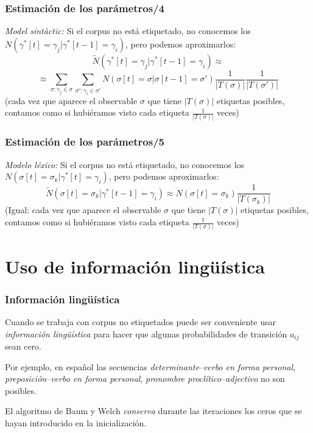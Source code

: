 \documentclass{beamer}
\begin{document}
\begin{frame}
\frametitle{ Estimación de los parámetros/4}

{
{\emph{Model sintàctic:} Si el corpus no está etiquetado, no
  conocemos los
  \(N(\gamma^*[t]=\gamma_j|\gamma^*[t-1]=\gamma_i)\), pero podemos
  aproximarlos:}
{
\[
\tilde{N}(\gamma^*[t]=\gamma_j|\gamma^*[t-1]=\gamma_i)\approx
\]
\[
\approx \sum_{\sigma:\gamma_j\in\sigma} \sum_{\sigma':\gamma_i\in\sigma'}
N(\sigma[t]=\sigma|\sigma[t-1]=\sigma') \frac{1}{|T(\sigma)|} \frac{1}{|T(\sigma')|}
\]
}
{(cada vez que aparece el observable \(\sigma\) que tiene
  \(|T(\sigma)|\) etiquetas posibles, contamos como si hubiéramos visto
  cada etiqueta \(\frac{1}{|T(\sigma)|}\) veces)}
}
\end{frame}
\begin{frame}
\frametitle{ Estimación de los parámetros/5}

{
{\emph{Modelo léxico:} Si el corpus no está etiquetado, no conocemos
los  \(N(\sigma[t]=\sigma_k|\gamma^*[t]=\gamma_i)\), pero podemos aproximarlos:}
{
\[
\tilde{N}(\sigma[t]=\sigma_k|\gamma^*[t-1]=\gamma_i)\approx
N(\sigma[t]=\sigma_k) \frac{1}{|T(\sigma_k)|}
\]
}
{(Igual: cada vez que aparece el observable \(\sigma\) que tiene
  \(|T(\sigma)|\) etiquetas posibles, contamos como si hubiéramos visto cada etiqueta \(\frac{1}{|T(\sigma)|}\) veces)}
}
\end{frame}

\section{Uso de información lingüística}
\begin{frame}
\frametitle{ Información lingüística}

{
{Cuando se trabaja con corpus no etiquetados puede ser conveniente
  usar \emph{información lingüística} para hacer que algunas probabilidades de transición \(a_{ij}\) sean cero.}

{Por ejemplo, en español las secuencias
  \emph{determinante}--\emph{verbo en forma personal},
  \emph{preposición}--\emph{verbo en forma personal}, \emph{pronombre
    proclítico}--\emph{adjectivo} no son posibles.}

{El algoritmo de Baum y Welch \emph{conserva} durante las iteraciones los ceros que se hayan introducido en la inicialización.}
}
\end{frame}
\end{document}
